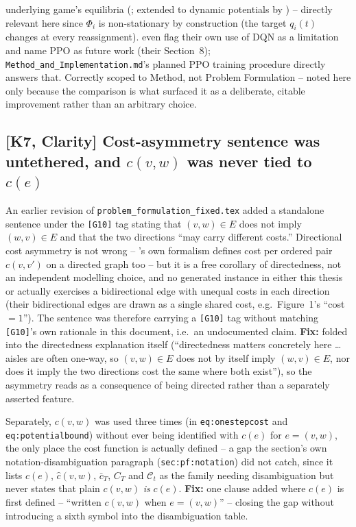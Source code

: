 \documentclass[11pt]{article}
\begin{document}
\begin{itemize}
    underlying game's equilibria (\citealp{ng1999policy}; extended to
    dynamic potentials by \citealp{devlin2012dynamic}) -- directly relevant
    here since $\Phi_i$ is non-stationary by construction (the target $q_i(t)$
    changes at every reassignment). \citeauthor{knippenberg2021} even flag
    their own use of DQN as a limitation and name PPO as future work (their
    Section~8); \texttt{Method\_and\_Implementation.md}'s planned PPO
    training procedure directly answers that. Correctly scoped to Method, not
    Problem Formulation -- noted here only because the comparison is what
    surfaced it as a deliberate, citable improvement rather than an
    arbitrary choice.
\end{itemize}

\subsection{[K7, Clarity] Cost-asymmetry sentence was untethered, and $c(v,w)$ was never tied to $c(e)$}
An earlier revision of \texttt{problem\_formulation\_fixed.tex} added a
standalone sentence under the \texttt{[G10]} tag stating that
$(v,w)\in E$ does not imply $(w,v)\in E$ and that the two directions ``may
carry different costs.'' Directional cost asymmetry is not wrong --
\citeauthor{knippenberg2021}'s own formalism defines cost per ordered pair
$c(v,v')$ on a directed graph too -- but it is a free corollary of
directedness, not an independent modelling choice, and no generated instance
in either this thesis or \citeauthor{knippenberg2021} actually exercises a
bidirectional edge with unequal costs in each direction (their bidirectional
edges are drawn as a single shared cost, e.g.\ Figure~1's ``cost~$=1$''). The
sentence was therefore carrying a \texttt{[G10]} tag without matching
\texttt{[G10]}'s own rationale in this document, i.e.\ an undocumented claim.
\textbf{Fix:} folded into the directedness explanation itself (``directedness
matters concretely here \ldots aisles are often one-way, so $(v,w)\in E$ does
not by itself imply $(w,v)\in E$, nor does it imply the two directions cost
the same where both exist''), so the asymmetry reads as a consequence of
being directed rather than a separately asserted feature.

Separately, $c(v,w)$ was used three times (in \texttt{eq:onestepcost} and
\texttt{eq:potentialbound}) without ever being identified with $c(e)$ for
$e=(v,w)$, the only place the cost function is actually defined -- a gap the
section's own notation-disambiguation paragraph (\texttt{sec:pf:notation})
did not catch, since it lists $c(e)$, $\hat c(v,w)$, $\bar c_T$, $C_T$ and
$\mathcal{C}_t$ as the family needing disambiguation but never states that
plain $c(v,w)$ \emph{is} $c(e)$. \textbf{Fix:} one clause added where $c(e)$
is first defined -- ``written $c(v,w)$ when $e=(v,w)$'' -- closing the gap
without introducing a sixth symbol into the disambiguation table.
\end{document}
